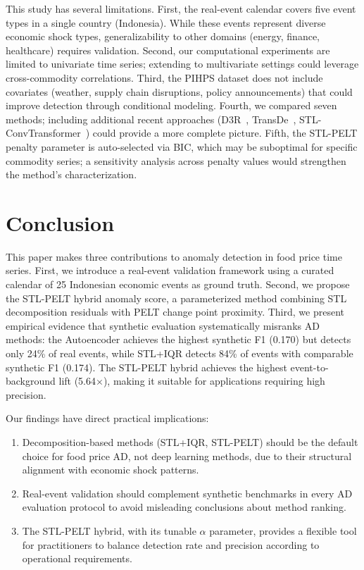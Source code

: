 \documentclass[10pt]{article}
\begin{document}
This study has several limitations. First, the real-event calendar covers five event types in a single country (Indonesia). While these events represent diverse economic shock types, generalizability to other domains (energy, finance, healthcare) requires validation. Second, our computational experiments are limited to univariate time series; extending to multivariate settings could leverage cross-commodity correlations. Third, the PIHPS dataset does not include covariates (weather, supply chain disruptions, policy announcements) that could improve detection through conditional modeling. Fourth, we compared seven methods; including additional recent approaches (D3R~\cite{w2023drift}, TransDe~\cite{hsieh2024transde}, STL-ConvTransformer~\cite{wu2024stlconv}) could provide a more complete picture. Fifth, the STL-PELT penalty parameter is auto-selected via BIC, which may be suboptimal for specific commodity series; a sensitivity analysis across penalty values would strengthen the method's characterization.

\section{Conclusion}
\label{sec:conclusion}

This paper makes three contributions to anomaly detection in food price time series. First, we introduce a real-event validation framework using a curated calendar of 25 Indonesian economic events as ground truth. Second, we propose the STL-PELT hybrid anomaly score, a parameterized method combining STL decomposition residuals with PELT change point proximity. Third, we present empirical evidence that synthetic evaluation systematically misranks AD methods: the Autoencoder achieves the highest synthetic F1 (0.170) but detects only 24\% of real events, while STL+IQR detects 84\% of events with comparable synthetic F1 (0.174). The STL-PELT hybrid achieves the highest event-to-background lift (5.64$\times$), making it suitable for applications requiring high precision.

Our findings have direct practical implications:
\begin{enumerate}[leftmargin=*]
    \item Decomposition-based methods (STL+IQR, STL-PELT) should be the default choice for food price AD, not deep learning methods, due to their structural alignment with economic shock patterns.
    \item Real-event validation should complement synthetic benchmarks in every AD evaluation protocol to avoid misleading conclusions about method ranking.
    \item The STL-PELT hybrid, with its tunable $\alpha$ parameter, provides a flexible tool for practitioners to balance detection rate and precision according to operational requirements.
\end{enumerate}
\end{document}
